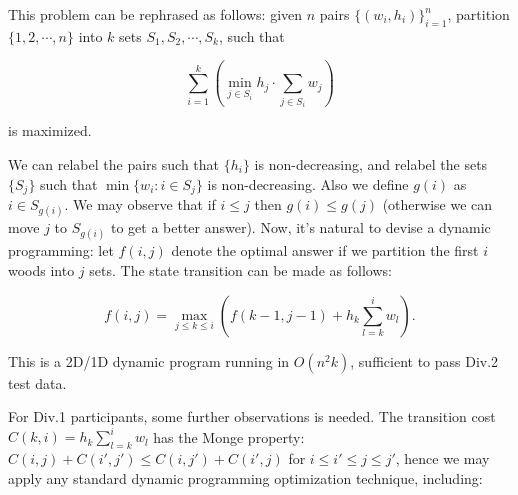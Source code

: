 \documentclass[a4paper,10.5pt,twoside]{article}
\begin{document}
This problem can be rephrased as follows: given $n$ pairs $\{(w_i, h_i)\}_{i=1}^n$, partition $\{1, 2, \cdots, n\}$ into $k$ sets $S_1, S_2, \cdots, S_k$, such that 

$$ \sum_{i=1}^k \left(\min_{j \in S_i} h_j \cdot \sum_{j \in S_i} w_j \right) $$

is maximized.

We can relabel the pairs such that $\{h_i\}$ is non-decreasing, and relabel the sets $\{S_j\}$ such that $\min\{w_i : i \in S_j\}$ is non-decreasing. Also we define $g(i)$ as $i \in S_{g(i)}$. We may observe that if $i \leq j$ then $g(i) \leq g(j)$ (otherwise we can move $j$ to $S_{g(i)}$ to get a better answer). Now, it's natural to devise a dynamic programming: let $f(i,j)$ denote the optimal answer if we partition the first $i$ woods into $j$ sets. The state transition can be made as follows:

$$ f(i,j) = \max_{j \leq k \leq i} \left( f(k-1, j-1) + h_{k} \sum_{l = k}^i w_l \right). $$

This is a 2D/1D dynamic program running in $O(n^2 k)$, sufficient to pass Div.2 test data. 

For Div.1 participants, some further observations is needed. The transition cost $C(k, i) = h_{k} \sum_{l = k}^i w_l$ has the Monge property: $C(i, j) + C(i', j') \leq C(i, j') + C(i', j)$ for $i \leq i' \leq j \leq j'$, hence we may apply any standard dynamic programming optimization technique, including:
\end{document}
